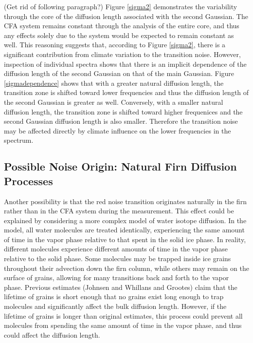 \documentclass[draft, jgrga]{AGUTeX}
\begin{document}
\begin{article}
(Get rid of following paragraph?)
Figure \ref{sigma2} demonstrates the variability through the core of the diffusion length associated with the second Gaussian. The CFA system remains constant through the analysis of the entire core, and thus any effects solely due to the system would be expected to remain constant as well. This reasoning suggests that, according to Figure \ref{sigma2}, there is a significant contribution from climate variation to the transition noise. However, inspection of individual spectra shows that there is an implicit dependence of the diffusion length of the second Gaussian on that of the main Gaussian. Figure \ref{sigmadependence} shows that with a greater natural diffusion length, the transition zone is shifted toward lower frequencies and thus the diffusion length of the second Gaussian is greater as well. Conversely, with a smaller natural diffusion length, the transition zone is shifted toward higher frequenices and the second Gaussian diffusion length is also smaller. Therefore the transition noise may be affected directly by climate influence on the lower frequencies in the spectrum.


\subsection{Possible Noise Origin: Natural Firn Diffusion Processes}

Another possibility is that the red noise transition originates naturally in the firn rather than in the CFA system during the measurement. This effect could be explained by considering a more complex model of water isotope diffusion. In the \citet{Johnsen2000} model, all water molecules are treated identically, experiencing the same amount of time in the vapor phase relative to that spent in the solid ice phase. In reality, different molecules experience different amounts of time in the vapor phase relative to the solid phase. Some molecules may be trapped inside ice grains throughout their advection down the firn column, while others may remain on the surface of grains, allowing for many transitions back and forth to the vapor phase. Previous estimates (Johnsen and Whillans and Grootes) claim that the lifetime of grains is short enough that no grains exist long enough to trap molecules and significantly affect the bulk diffusion length. However, if the lifetime of grains is longer than original estimates, this process could prevent all molecules from spending the same amount of time in the vapor phase, and thus could affect the diffusion length.


\end{article}
\end{document}
